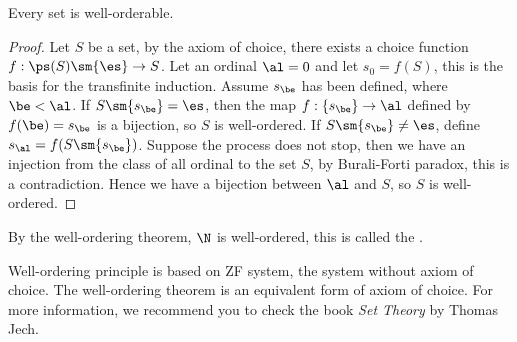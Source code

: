 \documentclass[10pt]{article}
\begin{document}
\begin{theorem}
    Every set is well-orderable.
\end{theorem}
\begin{proof}
    Let $S$ be a set, by the axiom of choice, there exists a choice function $f:\ps(S)\sm\{\es\}\to S$. Let an ordinal $\al=0$ and let ${s}_{0}=f(S)$, this is the basis for the transfinite induction. Assume ${s}_{\be}$ has been defined, where $\be<\al$. If $S\sm\{{s}_{\be}\}=\es$, then the map $f:\{{s}_{\be}\}\to\al$ defined by $f(\be)={s}_{\be}$ is a bijection, so $S$ is well-ordered. If $S\sm\{{s}_{\be}\}\ne\es$, define ${s}_{\al}=f(S\sm\{{s}_{\be}\})$. Suppose the process does not stop, then we have an injection from the class of all ordinal to the set $S$, by Burali-Forti paradox, this is a contradiction. Hence we have a bijection between $\al$ and $S$, so $S$ is well-ordered.
\end{proof}
\par
By the well-ordering theorem, $\N$ is well-ordered, this is called the .
\begin{remark}
    Well-ordering principle is based on ZF system, the system without axiom of choice. The well-ordering theorem is an equivalent form of axiom of choice. For more information, we recommend you to check the book \textit{Set Theory} by Thomas Jech.
\end{remark}
\end{document}
